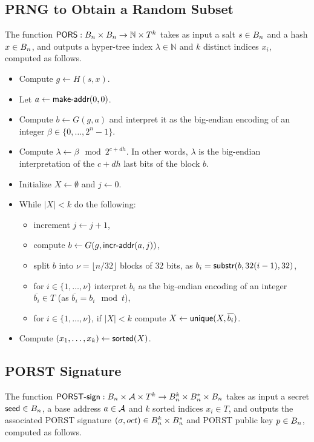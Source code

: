 \subsection{PRNG to Obtain a Random Subset}

The function $\textsf{PORS} : B_n \times B_n \to \mathbb{N} \times T^k$ takes as input a salt $s \in B_n$ and a hash $x \in B_n$, and outputs a hyper-tree index $\lambda \in \mathbb{N}$ and $k$ distinct indices $x_i$, computed as follows.

\begin{itemize}
\item Compute $g \gets H(s, x)$.
\item Let $a \gets \textsf{make-addr}(0,0)$.
\item Compute $b \gets G(g, a)$ and interpret it as the big-endian encoding of an integer $\beta \in \{0, \ldots, 2^n-1\}$.
\item Compute $\lambda \gets \beta \mod 2^{c+dh}$. In other words, $\lambda$ is the big-endian interpretation of the $c+dh$ last bits of the block $b$.
\item Initialize $X \gets \emptyset$ and $j \gets 0$.
\item While $|X| < k$ do the following:
    \begin{itemize}
    \item increment $j \gets j+1$,
    \item compute $b \gets G(g, \textsf{incr-addr}(a,j))$,
    \item split $b$ into $\nu = \lfloor n / 32 \rfloor$ blocks of $32$ bits, as $b_i = \textsf{substr}(b, 32(i-1), 32)$,
    \item for $i \in \{1, \ldots, \nu\}$ interpret $b_i$ as the big-endian encoding of an integer $\overline{b_i} \in T$ (as $\overline{b_i} = b_i \mod t$),
    \item for $i \in \{1, \ldots, \nu\}$, if $|X| < k$ compute $X \gets \textsf{unique}(X, \overline{b_i})$.
    \end{itemize}
\item Compute $(x_1, \ldots, x_k) \gets \textsf{sorted}(X)$.
\end{itemize}

\subsection{PORST Signature}

The function $\textsf{PORST-sign} : B_n \times \mathcal{A} \times T^k \to B_n^k \times B_n^* \times B_n$ takes as input a secret $\textsf{seed} \in B_n$, a base address $a \in \mathcal{A}$ and $k$ sorted indices $x_i \in T$, and outputs the associated PORST signature $(\sigma, oct) \in B_n^k \times B_n^*$ and PORST public key $p \in B_n$, computed as follows.

